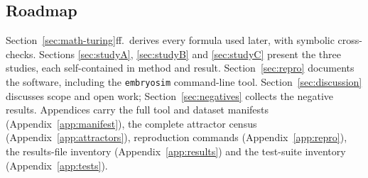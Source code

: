 \subsection{Roadmap}

Section~\ref{sec:math-turing}ff.\ derives every formula used later, with
symbolic cross-checks. Sections \ref{sec:studyA}, \ref{sec:studyB} and
\ref{sec:studyC} present the three studies, each self-contained in method
and result. Section~\ref{sec:repro} documents the software, including the
\texttt{embryosim} command-line tool. Section~\ref{sec:discussion} discusses
scope and open work; Section~\ref{sec:negatives} collects the negative
results. Appendices carry the full tool and dataset manifests
(Appendix~\ref{app:manifest}), the complete attractor census
(Appendix~\ref{app:attractors}), reproduction commands
(Appendix~\ref{app:repro}), the results-file inventory
(Appendix~\ref{app:results}) and the test-suite inventory
(Appendix~\ref{app:tests}).

